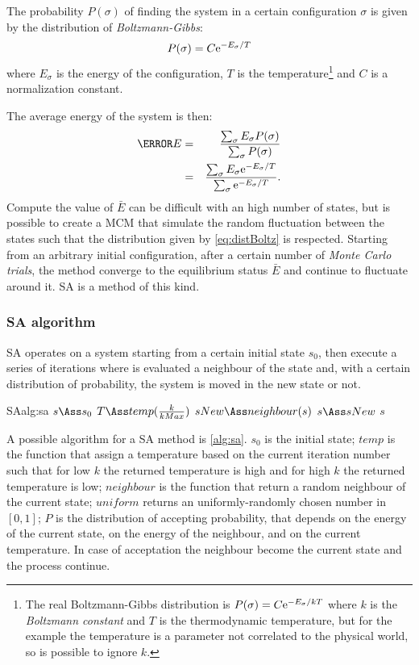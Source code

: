 \documentclass[dissertation.tex]{subfiles}
\begin{document}
The probability $P(\sigma)$ of finding the system in a certain
configuration $\sigma$ is given by the distribution of
\emph{Boltzmann-Gibbs}:
\begin{equation}\label{eq:distBoltz}
  P(\sigma) = C \mathrm{e}^{-E_\sigma/T}
\end{equation}
where $E_\sigma$ is the energy of the configuration, $T$ is the
temperature\footnote{The real Boltzmann-Gibbs distribution is
  $P(\sigma) = C \mathrm{e}^{-E_\sigma/kT}$ where $k$ is the \emph{Boltzmann
    constant} and $T$ is the thermodynamic temperature, but for the
  example the temperature is a parameter not correlated to the
  physical world, so is possible to ignore $k$.} and $C$ is a
normalization constant.

The average energy of the system is then:
\begin{eqnarray*}
  \bar{E} &=& \frac{\sum_\sigma E_\sigma P(\sigma)}{\sum_\sigma
    P(\sigma)}\\
  &=& \frac{\sum_\sigma E_\sigma \me^{-E_\sigma/T}}{\sum_\sigma \me^{-E_\sigma/T}}.
\end{eqnarray*}
Compute the value of $\bar{E}$ can be difficult with an high number of
states, but is possible to create a \ac{MCM} that simulate the random
fluctuation between the states such that the distribution given by
\cref{eq:distBoltz} is respected. Starting from an arbitrary initial
configuration, after a certain number of \emph{Monte Carlo trials},
the method converge to the equilibrium status $\bar{E}$ and continue
to fluctuate around it. \ac{SA} is a method of this kind.

\subsubsection{\acf{SA} algorithm}
\ac{SA} operates on a system starting from a certain initial state
$s_0$, then execute a series of iterations where is evaluated a
neighbour of the state and, with a certain distribution of
probability, the system is moved in the new state or not.

\begin{algo}{\acf{SA}}{alg:sa}
  \State $s\Ass s_0$
  \State $T\Ass temp(\frac{k}{kMax})$
  \State $sNew\Ass neighbour(s)$
  \State $s\Ass sNew$
  \EndIf
  \EndFor
  \State\Return $s$
  \EndFunction
\end{algo}
A possible algorithm for a \ac{SA} method is \cref{alg:sa}. $s_0$ is
the initial state; $temp$ is the function that assign a
temperature based on the current iteration number such that for low
$k$ the returned temperature is high and for high $k$ the returned temperature
is low; $neighbour$ is the function that return a random neighbour of
the current state; $uniform$ returns an uniformly-randomly chosen
number in $[0,1]$; $P$ is the distribution of accepting probability,
that depends on the energy of the current state, on the energy of the
neighbour, and on the current temperature. In case of acceptation the
neighbour become the current state and the process continue.
\end{document}
